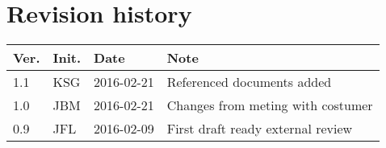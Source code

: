 \chapter*{Revision history}
\label{app:rev_his}


\begin{tabular}{b{1cm} b{1cm} b{2cm} b{8cm}}
    \textbf{Ver.} & \textbf{Init.} & \textbf{Date} & \textbf{Note} \\
    \hline
    1.1 & KSG & 2016-02-21 & Referenced documents added \\
    1.0 & JBM & 2016-02-21 & Changes from meting with costumer \\
    0.9 & JFL & 2016-02-09 & First draft ready external review \\
\end{tabular}
